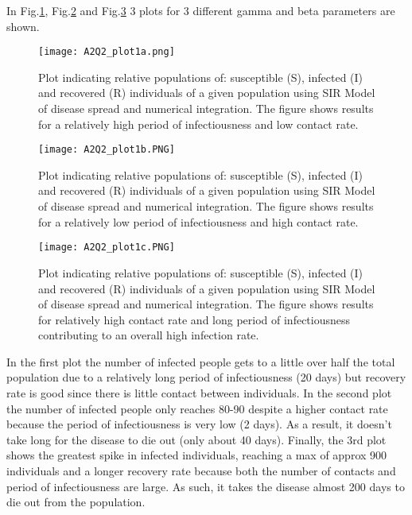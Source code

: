 \documentclass[apj]{emulateapj}
\begin{document}
In Fig.\ref{fig:Q2plot1a}, Fig.\ref{fig:Q2plot1b} and Fig.\ref{fig:Q2plot1c} 3 plots for 3 different gamma and beta parameters are shown.

\begin{figure}
    \centering
    \texttt{[image: A2Q2\_plot1a.png]}
    \caption{Plot indicating relative populations of: susceptible (S), infected (I) and recovered (R) individuals of a given population using SIR Model of disease spread and numerical integration. The figure shows results for a relatively high period of infectiousness and low contact rate.}
    \label{fig:Q2plot1a}
\end{figure}

\begin{figure}
    \centering
    \texttt{[image: A2Q2\_plot1b.PNG]}
    \caption{Plot indicating relative populations of: susceptible (S), infected (I) and recovered (R) individuals of a given population using SIR Model of disease spread and numerical integration. The figure shows results for a relatively low period of infectiousness and high contact rate.}
    \label{fig:Q2plot1b}
\end{figure}
 
\vspace{5mm} %
\begin{figure}
    \centering
    \texttt{[image: A2Q2\_plot1c.PNG]}
    \caption{Plot indicating relative populations of: susceptible (S), infected (I) and recovered (R) individuals of a given population using SIR Model of disease spread and numerical integration. The figure shows results for relatively high contact rate and long period of infectiousness contributing to an overall high infection rate.}
    \label{fig:Q2plot1c}
\end{figure}
In the first plot the number of infected people gets to a little over half the total population due to a relatively long period of infectiousness (20 days) but recovery rate is good since there is little contact between individuals. In the second plot the number of infected people only reaches 80-90 despite a higher contact rate because the period of infectiousness is very low (2 days). As a result, it doesn't take long for the disease to die out (only about 40 days). Finally, the 3rd plot shows the greatest spike in infected individuals, reaching a max of approx 900 individuals and a longer recovery rate because both the number of contacts and period of infectiousness are large. As such, it takes the disease almost 200 days to die out from the population.
\end{document}
